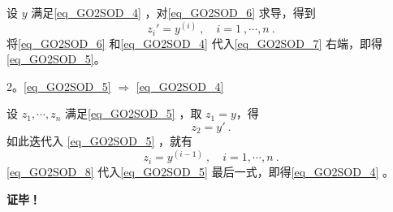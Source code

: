 设 $y$ 满足\autoref{eq_GO2SOD_4} ，对\autoref{eq_GO2SOD_6} 求导，得到
\begin{equation}\label{eq_GO2SOD_7}
z_i'=y^{(i)}~,\quad i=1~,\cdots,n~.
\end{equation}
将\autoref{eq_GO2SOD_6} 和\autoref{eq_GO2SOD_4} 代入\autoref{eq_GO2SOD_7} 右端，即得\autoref{eq_GO2SOD_5}。

2。\autoref{eq_GO2SOD_5} $\Rightarrow$ \autoref{eq_GO2SOD_4} 

设 $z_1,\cdots,z_n$ 满足\autoref{eq_GO2SOD_5} ，取 $z_1=y$，得
\begin{equation}
z_2=y'~.
\end{equation}
如此迭代入 \autoref{eq_GO2SOD_5} ，就有
\begin{equation}\label{eq_GO2SOD_8}
z_i=y^{(i-1)}~,\quad i=1,\cdots,n~.
\end{equation}
\autoref{eq_GO2SOD_8} 代入\autoref{eq_GO2SOD_5} 最后一式，即得\autoref{eq_GO2SOD_4} 。

\textbf{证毕！}

